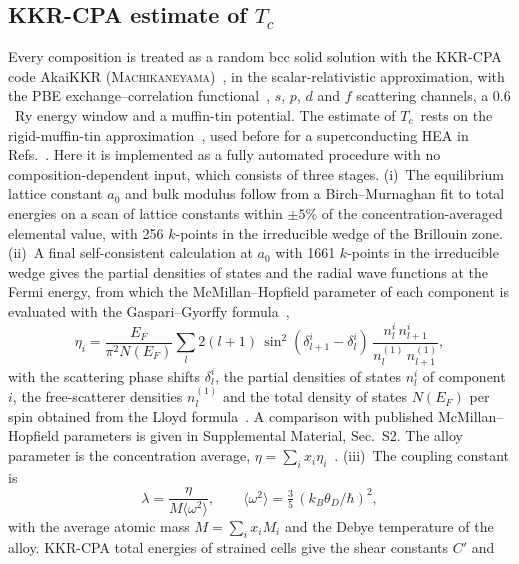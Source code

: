 \documentclass[aps,prb,reprint,superscriptaddress,twocolumn,floatfix]{revtex4-2}
\newcommand{\Tc}{$T_c$}
\newcommand{\SI}[1]{Supplemental Material, Sec.~#1}
\begin{document}
\subsection{KKR-CPA estimate of $T_c$}

Every composition is treated as a random bcc solid solution with the KKR-CPA code
AkaiKKR (\textsc{Machikaneyama})~\cite{Akai1989}, in the scalar-relativistic approximation,
with the PBE exchange--correlation functional~\cite{PerdewBurkeErnzerhof1996}, $s$, $p$,
$d$ and $f$ scattering channels, a $0.6$~Ry energy window and a muffin-tin potential. The
estimate of \Tc\ rests on the rigid-muffin-tin
approximation~\cite{GaspariGyorffy1972,Papaconstantopoulos1977,Butler1977}, used before for a
superconducting HEA in Refs.~\cite{Jaskiewicz2016,Jaskiewicz2019}. Here it is implemented as
a fully automated procedure with no composition-dependent input, which consists of three
stages.
(i)~The equilibrium lattice constant $a_0$ and bulk modulus follow from a Birch--Murnaghan
fit to total energies on a scan of lattice constants within $\pm 5\%$ of the
concentration-averaged elemental value, with 256 $k$-points in the irreducible wedge of
the Brillouin zone. (ii)~A final self-consistent calculation at $a_0$ with 1661 $k$-points
in the irreducible wedge gives the partial densities of states and the radial wave
functions at the Fermi energy, from which the McMillan--Hopfield parameter of each
component is evaluated with the Gaspari--Gyorffy formula~\cite{GaspariGyorffy1972},
\begin{equation}
  \eta_i = \frac{E_F}{\pi^2 N(E_F)} \sum_l 2(l+1)\,
  \sin^2(\delta_{l+1}^{i} - \delta_{l}^{i})\,
  \frac{n_l^{i}\, n_{l+1}^{i}}{n_l^{(1)}\, n_{l+1}^{(1)}},
  \label{eq:gg}
\end{equation}
with the scattering phase shifts $\delta_l^i$, the partial densities of states $n_l^i$ of
component $i$, the free-scatterer densities $n_l^{(1)}$ and the total density of states
$N(E_F)$ per spin obtained from the Lloyd formula~\cite{Lloyd1967}. A comparison with published
McMillan--Hopfield parameters is given in \SI{S2}. The alloy parameter is the concentration average,
$\eta = \sum_i x_i \eta_i$~\cite{Jaskiewicz2016}. (iii)~The coupling constant is
\begin{equation}
  \lambda = \frac{\eta}{M\langle\omega^2\rangle},\qquad
  \langle\omega^2\rangle = \tfrac{3}{5}\,(k_B\theta_D/\hbar)^2 ,
  \label{eq:lambda}
\end{equation}
with the average atomic mass $M = \sum_i x_i M_i$ and the Debye temperature of the
alloy. KKR-CPA total energies of strained cells give the shear constants $C'$ and
\end{document}
